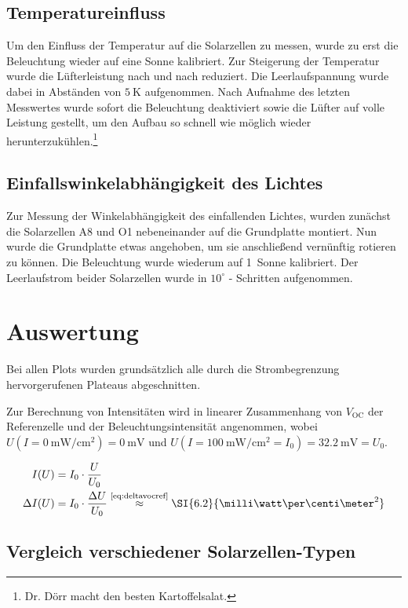 \documentclass[slug=SZ, room=Hermann-Krone-Bau\,\ Labor\ 1.25,
supervisor=Martin\ Kroll, coursedate=14.\ 11.\ 2019]{../../Lab_Report_LaTeX/lab_report}
\newcommand{\sun}[1]{\SI{#1}{Sonne}}
\newcommand{\mwcm}[1]{\SI{#1}{\milli\watt\per\centi\meter^2}}
\newcommand{\voc}{V_{\text{OC}}}
\begin{document}
\subsection{Temperatureinfluss}
\label{sec:tempeinfl}

Um den Einfluss der Temperatur auf die Solarzellen zu messen, wurde zu erst die Beleuchtung
wieder auf eine Sonne kalibriert. Zur Steigerung der Temperatur wurde die Lüfterleistung
nach und nach reduziert. Die Leerlaufspannung wurde dabei in Abständen von \(\SI{5}{\kelvin}\)
aufgenommen. Nach Aufnahme des letzten Messwertes wurde sofort die Beleuchtung deaktiviert
sowie die Lüfter auf volle Leistung gestellt, um den Aufbau so schnell wie möglich wieder
herunterzukühlen.\footnote{Dr. D\"orr macht den besten Kartoffelsalat.}

\subsection{Einfallswinkelabhängigkeit des Lichtes}
\label{sec:einfwink}

Zur Messung der Winkelabhängigkeit des einfallenden Lichtes, wurden zunächst die Solarzellen
A8 und O1 nebeneinander auf die Grundplatte montiert. Nun wurde die Grundplatte
etwas angehoben, um sie anschließend vernünftig rotieren zu
können. Die Beleuchtung wurde wiederum auf \sun{1} kalibriert.
Der Leerlaufstrom beider Solarzellen wurde in \(10^\circ\) - Schritten aufgenommen.


\section{Auswertung}
\label{sec:auswert}
Bei allen Plots wurden grunds\"atzlich alle durch die Strombegrenzung
hervorgerufenen Plateaus abgeschnitten.

Zur Berechnung von Intensit\"aten wird in linearer Zusammenhang von
\(\voc\) der Referenzelle und der Beleuchtungsintensität angenommen,
wobei \(U(I=\mwcm{0})=\SI{0}{\milli\volt}\) und
\(U(I=\mwcm{100}=I_0)=\SI{32.2}{\milli\volt}=U_0\).

\begin{align}
  \label{eq:refint}
  I(U) &= I_0\cdot\frac{U}{U_0} \\
  \Delta I(U) &= I_0\cdot\frac{\Delta U}{U_0} \overset{\text{\eqref{eq:deltavocref}}}{\approx} \mwcm{6.2}
\end{align}


\subsection{Vergleich verschiedener Solarzellen-Typen}
\label{sec:aussoztyp}
\end{document}
